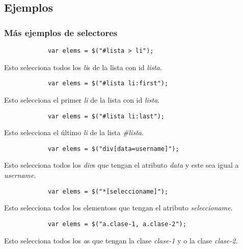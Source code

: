 \documentclass[10pt]{beamer}
\begin{document}
\subsection{Ejemplos}
\begin{frame}[fragile]
	\frametitle{Más ejemplos de selectores}
	
	\pause \begin{lstlisting}
			var elems = $("#lista > li");
		\end{lstlisting}
	\pause Esto selecciona todos los \emph{li}s de la lista con id \emph{lista}.
	
	\pause \begin{lstlisting}
			var elems = $("#lista li:first");
		\end{lstlisting}
	\pause Esto selecciona el primer \emph{li} de la lista con id \emph{lista}.
	
	\pause \begin{lstlisting}
			var elems = $("#lista li:last");
		\end{lstlisting}
	\pause Esto selecciona el último \emph{li} de la lista \emph{\#lista}.
	
	\pause \begin{lstlisting}
			var elems = $("div[data=username]");
		\end{lstlisting}
	\pause Esto selecciona todos los \emph{div}s que tengan el atributo \emph{data} y este sea igual a \emph{username}.
	
	\pause \begin{lstlisting}
			var elems = $("*[seleccioname]");
		\end{lstlisting}
	\pause Esto selecciona todos los elementoss que tengan el atributo \emph{seleccioname}.
	
	\pause \begin{lstlisting}
			var elems = $("a.clase-1, a.clase-2");
		\end{lstlisting}
	\pause Esto selecciona todos los \emph{a}s que tengan la clase \emph{clase-1} y o la clase \emph{clase-2}.
\end{frame}
\end{document}
